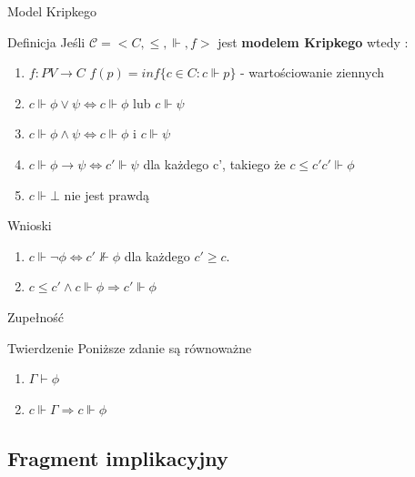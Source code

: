 \documentclass{beamer}
\begin{document}
\begin{frame}{Model Kripkego}
 \begin{block}{Definicja}
Jeśli \( \mathcal{C} = < C, \leq, \Vdash, f >\) jest \textbf{modelem Kripkego} wtedy : 
\begin{enumerate}
	\item \( f : PV \rightarrow C\)  \( f(p) = inf\{c \in C : c \Vdash p\}\) - wartościowanie ziennych
	\item \(c \Vdash \phi \vee \psi \Leftrightarrow c \Vdash  \phi \) lub \( c \Vdash \psi \) 
 \item \(c \Vdash \phi \wedge \psi \Leftrightarrow c \Vdash  \phi \) i \( c \Vdash \psi \) 
 \item \(c \Vdash \phi \rightarrow \psi \Leftrightarrow c' \Vdash  \psi \) dla każdego c', takiego że \( c \leq c'  c' \Vdash \phi \) 
 \item \( c \Vdash \bot \) nie jest prawdą
 
\end{enumerate}
 \end{block}
 
  \begin{block}{Wnioski}

\begin{enumerate}

 \item \(c \Vdash \neg \phi \Leftrightarrow  c'\nVdash \phi\) dla każdego \( c' \geq c\).

 \item \(c \leq c' \wedge  c \Vdash \phi \Rightarrow c' \Vdash \phi \)
\end{enumerate}
 \end{block}
\end{frame}


\begin{frame}{Zupełność}
 \begin{block}{Twierdzenie}
Poniższe zdanie są równoważne
\begin{enumerate}
\item \( \Gamma \vdash \phi \)
\item \( c \Vdash \Gamma \Rightarrow c \Vdash \phi \)
\end{enumerate}
 \end{block}
 
\end{frame}

\subsection{Fragment implikacyjny}
\end{document}
